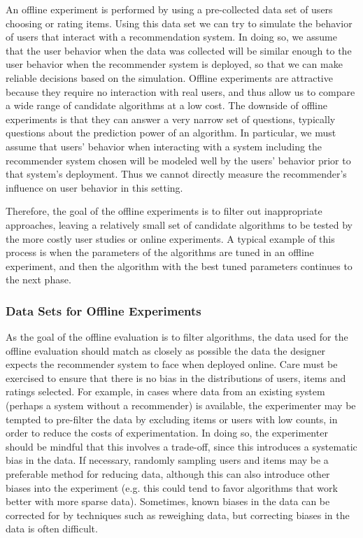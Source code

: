 An offline experiment is performed by using a pre-collected data set of users choosing or rating items. Using this data set we can try to simulate the behavior of users that interact with a recommendation system. In doing so, we assume that the user behavior when the data was collected will be similar enough to the user behavior when the recommender system is deployed, so that we can make reliable decisions based on the simulation. Offline experiments are attractive because they require no interaction with real users, and thus allow us to compare a wide range of candidate algorithms at a low cost. The downside of offline experiments is that they can answer a very narrow set of questions, typically questions about the prediction power of an algorithm. In particular, we must assume that users’ behavior when interacting with a system including the recommender system chosen will be modeled well by the users’ behavior prior to that system’s deployment. Thus we cannot directly measure the recommender’s influence on user behavior in this setting.

Therefore, the goal of the offline experiments is to filter out inappropriate approaches, leaving a relatively small set of candidate algorithms to be tested by the more costly user studies or online experiments. A typical example of this process is when the parameters of the algorithms are tuned in an offline experiment, and then the algorithm with the best tuned parameters continues to the next phase.

\subsubsection{Data Sets for Offline Experiments}

As the goal of the offline evaluation is to filter algorithms, the data used for the offline evaluation should match as closely as possible the data the designer expects the recommender system to face when deployed online. Care must be exercised to ensure that there is no bias in the distributions of users, items and ratings selected. For example, in cases where data from an existing system (perhaps a system without a recommender) is available, the experimenter may be tempted to pre-filter the data by excluding items or users with low counts, in order to reduce the costs of experimentation. In doing so, the experimenter should be mindful that this involves a trade-off, since this introduces a systematic bias in the data. If necessary, randomly sampling users and items may be a preferable method for reducing data, although this can also introduce other biases into the experiment (e.g. this could tend to favor algorithms that work better with more sparse data). Sometimes, known biases in the data can be corrected for by techniques such as reweighing data, but correcting biases in the data is often difficult.

